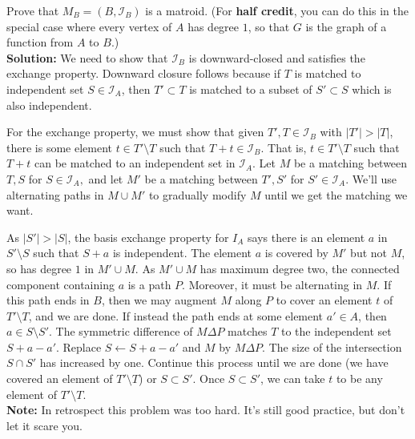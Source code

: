 \documentclass[12pt]{article}
\begin{document}
\begin{enumerate}
 Prove that $M_B = (B,\mathcal{I}_B)$ is a matroid. (For {\bf half credit}, you can do this in the special case where every vertex of $A$ has degree $1$, so that $G$ is the graph of a function from $A$ to $B$.)\\
 
 \textbf{Solution: } We need to show that $\mathcal{I}_B$ is downward-closed and satisfies the exchange property. Downward closure follows because if $T$ is matched to independent set $S \in \mathcal{I}_A$, then $T' \subset T$ is matched to a subset of $S' \subset S$ which is also independent.
 
 For the exchange property, we must show that given $T', T \in \mathcal{I}_B$ with $|T'| > |T|$, there is some element $t \in T'\setminus T$ such that $T + t \in \mathcal{I}_B$. That is, $t \in T'\setminus T$ such that $T + t$ can be matched to an independent set in $\mathcal{I}_A$. Let $M$ be a matching between $T, S$ for $S\in \mathcal{I}_A,$ and let $M'$ be a matching between $T', S'$ for $S'\in \mathcal{I}_A.$ We'll use alternating paths in $M \cup M'$ to gradually modify $M$ until we get the matching we want.
 
As $|S'| > |S|$, the basis exchange property for $I_A$ says there is an element $a$ in $S' \setminus S$ such that $S +a$ is independent. The element $a$ is covered by $M'$ but not $M$, so has degree $1$ in $M' \cup M$. As $M' \cup M$ has maximum degree two, the connected component containing $a$ is a path $P$. Moreover, it must be alternating in $M$. If this path ends in $B$, then we may augment $M$ along $P$ to cover an element $t$ of $T' \setminus T$, and we are done. If instead the path ends at some element $a' \in A$, then $a \in S \setminus S'$. The symmetric difference of $M\Delta P$ matches $T$ to the independent set $S + a - a'$. Replace $S \leftarrow S + a - a'$ and $M$ by $M \Delta P$. The size of the intersection $S \cap S'$ has increased by one. Continue this process until we are done (we have covered an element of $T' \setminus T$) or $S \subset S'$. Once $S \subset S'$, we can take $t$ to be any element of $T'\setminus T$.\\ \textbf{Note: } In retrospect this problem was too hard. It's still good practice, but don't let it scare you.





\end{enumerate}
\end{document}
